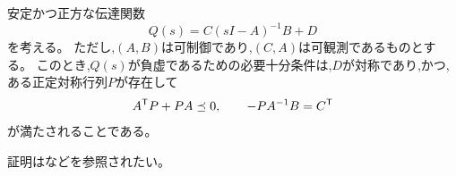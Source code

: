 \documentclass[tombow,dvipdfmx]{corona-a5-1.1}
\begin{document}
\begin{補題}\label{lem:nilem}
安定かつ正方な伝達関数
\[
Q(s)=C(sI-A)^{-1}B + D
\]
を考える。
ただし,$(A,B)$は可制御であり,$(C,A)$は可観測であるものとする。
このとき,$Q(s)$が負虚であるための必要十分条件は,$D$が対称であり,かつ,
ある正定対称行列$P$が存在して
\begin{align*}
A^{\sf T}P+PA \preceq 0
,\qquad
-PA^{-1}B = C^{\sf T}
\end{align*}
が満たされることである。
\end{補題}

証明は\cite[Lemma 7]{xiong2010negative}などを参照されたい。
\end{document}
